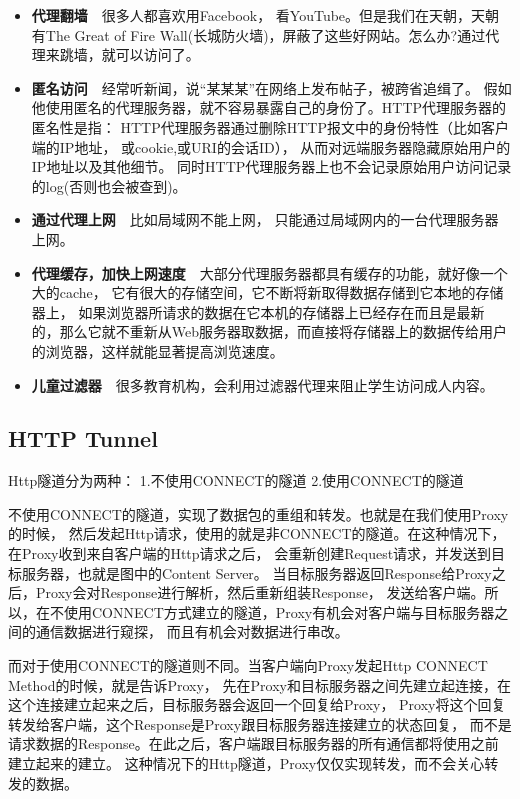 \documentclass{book}
\begin{document}
\begin{itemize}
\item{\textbf{代理翻墙}}~~很多人都喜欢用Facebook， 看YouTube。但是我们在天朝，天朝有The Great of Fire Wall(长城防火墙)，屏蔽了这些好网站。怎么办?通过代理来跳墙，就可以访问了。
\item{\textbf{匿名访问}}~~经常听新闻，说“某某某”在网络上发布帖子，被跨省追缉了。
假如他使用匿名的代理服务器，就不容易暴露自己的身份了。HTTP代理服务器的匿名性是指： 
HTTP代理服务器通过删除HTTP报文中的身份特性（比如客户端的IP地址， 或cookie,或URI的会话ID），
从而对远端服务器隐藏原始用户的IP地址以及其他细节。 同时HTTP代理服务器上也不会记录原始用户访问记录的log(否则也会被查到)。
\item{\textbf{通过代理上网}}~~比如局域网不能上网， 只能通过局域网内的一台代理服务器上网。
\item{\textbf{代理缓存，加快上网速度}}~~大部分代理服务器都具有缓存的功能，就好像一个大的cache， 它有很大的存储空间，它不断将新取得数据存储到它本地的存储器上， 如果浏览器所请求的数据在它本机的存储器上已经存在而且是最新的，那么它就不重新从Web服务器取数据，而直接将存储器上的数据传给用户的浏览器，这样就能显著提高浏览速度。
\item{\textbf{儿童过滤器}}~~很多教育机构，会利用过滤器代理来阻止学生访问成人内容。
\end{itemize}

\subsection{HTTP Tunnel}

Http隧道分为两种：
1.不使用CONNECT的隧道
2.使用CONNECT的隧道

不使用CONNECT的隧道，实现了数据包的重组和转发。也就是在我们使用Proxy的时候，
然后发起Http请求，使用的就是非CONNECT的隧道。在这种情况下，在Proxy收到来自客户端的Http请求之后，
会重新创建Request请求，并发送到目标服务器，也就是图中的Content Server。
当目标服务器返回Response给Proxy之后，Proxy会对Response进行解析，然后重新组装Response，
发送给客户端。所以，在不使用CONNECT方式建立的隧道，Proxy有机会对客户端与目标服务器之间的通信数据进行窥探，
而且有机会对数据进行串改。

而对于使用CONNECT的隧道则不同。当客户端向Proxy发起Http CONNECT Method的时候，就是告诉Proxy，
先在Proxy和目标服务器之间先建立起连接，在这个连接建立起来之后，目标服务器会返回一个回复给Proxy，
Proxy将这个回复转发给客户端，这个Response是Proxy跟目标服务器连接建立的状态回复，
而不是请求数据的Response。在此之后，客户端跟目标服务器的所有通信都将使用之前建立起来的建立。
这种情况下的Http隧道，Proxy仅仅实现转发，而不会关心转发的数据。
\end{document}

